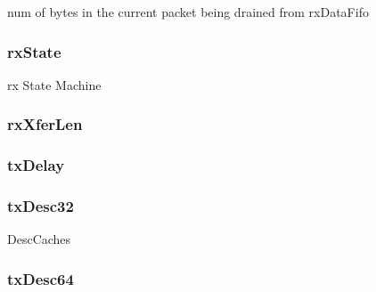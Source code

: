 \label{classNSGigE_adb88096e75f5f09ced6a2d393a65f07c}
num of bytes in the current packet being drained from rxDataFifo \hypertarget{classNSGigE_a17c506ad3a705ec9dbd1762e6a80fbf5}{
\subsubsection[{rxState}]{ {\bf rxState}}}
\label{classNSGigE_a17c506ad3a705ec9dbd1762e6a80fbf5}
rx State Machine \hypertarget{classNSGigE_a4adabe285146911e77698a9d405ef3b5}{
\subsubsection[{rxXferLen}]{ {\bf rxXferLen}}}
\label{classNSGigE_a4adabe285146911e77698a9d405ef3b5}
\hypertarget{classNSGigE_a58f95130ec6a9f1aa53164dda8092a4c}{
\subsubsection[{txDelay}]{ {\bf txDelay}}}
\label{classNSGigE_a58f95130ec6a9f1aa53164dda8092a4c}
\hypertarget{classNSGigE_a6002ce8597c7299cd50223ef34c88b2f}{
\subsubsection[{txDesc32}]{ {\bf txDesc32}}}
\label{classNSGigE_a6002ce8597c7299cd50223ef34c88b2f}
DescCaches \hypertarget{classNSGigE_a617a181e3d109f5a02baf11f4d9464c8}{
\subsubsection[{txDesc64}]{ {\bf txDesc64}}}
